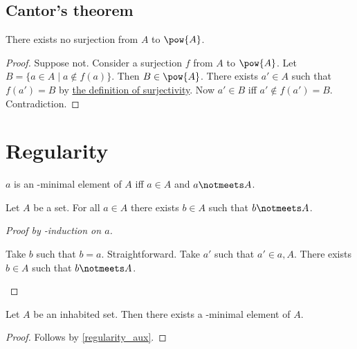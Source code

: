 \subsection{Cantor's theorem}


\begin{theorem}[Cantor]\label{cantor}
    There exists no surjection from $A$ to $\pow{A}$.
\end{theorem}
\begin{proof}
    Suppose not.
    Consider a surjection $f$ from $A$ to $\pow{A}$.
    Let $B = \{a \in A \mid a\notin f(a)\}$.
    Then $B\in\pow{A}$.
    There exists $a'\in A$ such that $f(a') = B$ by \hyperref[surj]{the definition of surjectivity}.
    Now $a' \in B$ iff $a' \notin f(a') = B$.
    Contradiction.
\end{proof}
\section{Regularity}

\begin{abbreviation}\label{elemminimal}
    $a$ is an \in-minimal element of $A$ iff
    $a\in A$ and $a\notmeets A$.
\end{abbreviation}

\begin{lemma}\label{regularity_aux}
    Let $A$ be a set.
    For all $a\in A$ there exists $b\in A$ such that
    $b\notmeets A$.
\end{lemma}
\begin{proof}[Proof by \in-induction on $a$]
    \begin{byCase}
            Take $b$ such that $b = a$.
            Straightforward.
            Take $a'$ such that $a'\in a, A$.
            There exists $b\in A$ such that $b\notmeets A$.
    \end{byCase}
\end{proof}

\begin{proposition}[Regularity]%
\label{regularity}
    Let $A$ be an inhabited set.
    Then there exists a \in-minimal element of $A$.
\end{proposition}
\begin{proof}
    Follows by \cref{regularity_aux}.
\end{proof}


